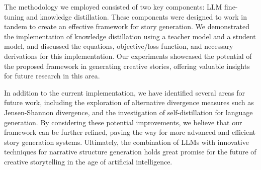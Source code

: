 \documentclass{article} %
\begin{document}
The methodology we employed consisted of two key components: LLM fine-tuning and knowledge distillation. These components were designed to work in tandem to create an effective framework for story generation. We demonstrated the implementation of knowledge distillation using a teacher model and a student model, and discussed the equations, objective/loss function, and necessary derivations for this implementation. Our experiments showcased the potential of the proposed framework in generating creative stories, offering valuable insights for future research in this area.

In addition to the current implementation, we have identified several areas for future work, including the exploration of alternative divergence measures such as Jensen-Shannon divergence, and the investigation of self-distillation for language generation. By considering these potential improvements, we believe that our framework can be further refined, paving the way for more advanced and efficient story generation systems. Ultimately, the combination of LLMs with innovative techniques for narrative structure generation holds great promise for the future of creative storytelling in the age of artificial intelligence.



\end{document}
